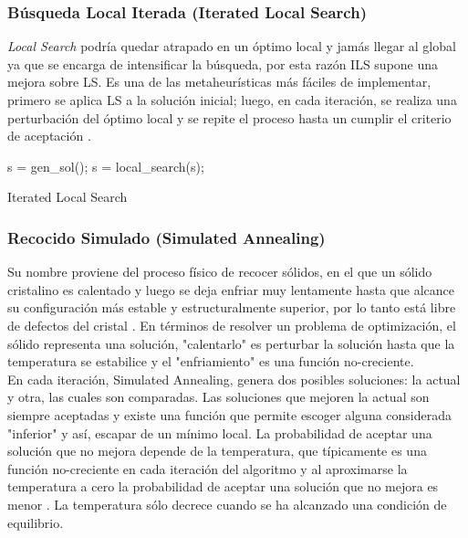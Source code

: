 \documentclass{ci5652}
\begin{document}

\subsubsection{Búsqueda Local Iterada (Iterated Local Search)}

\textit{Local Search} podría quedar atrapado en un óptimo local y jamás llegar 
al global ya que se encarga de intensificar la búsqueda, por esta razón ILS 
supone una mejora sobre LS. Es una de las metaheurísticas más fáciles de 
implementar, primero se aplica LS a la solución inicial; luego, en cada 
iteración, se realiza una perturbación del óptimo local y se repite el proceso 
hasta un cumplir el criterio de aceptación \cite{Talbi_2009}.\\

\begin{algorithm}
 \DontPrintSemicolon
 \vspace*{0.1cm}
  s = gen\_sol();\;
  s = local\_search(s);\;
 \vspace*{0.1cm}
 \caption{Iterated Local Search}
\end{algorithm}



\subsubsection{Recocido Simulado (Simulated Annealing)}

Su nombre proviene del proceso físico de recocer sólidos, en el que un sólido 
cristalino es calentado y luego se deja enfriar muy lentamente hasta que alcance
su configuración más estable y estructuralmente superior, por lo tanto está 
libre de defectos del cristal \cite{Glover_2003}. En términos de resolver un 
problema de optimización, el sólido representa una solución, "calentarlo" es 
perturbar la solución hasta que la temperatura se estabilice y el "enfriamiento"
es una función no-creciente.\\

En cada iteración, Simulated Annealing, genera dos posibles soluciones: la 
actual y otra, las cuales son comparadas. Las soluciones que mejoren la actual 
son siempre aceptadas y existe una función que permite escoger alguna 
considerada "inferior" y así, escapar de un mínimo local. La probabilidad de
aceptar una solución que no mejora depende de la temperatura, que típicamente es
una función no-creciente en cada iteración del algoritmo y al aproximarse la
temperatura a cero la probabilidad de aceptar una solución que no mejora es 
menor \cite{Glover_2003}. La temperatura sólo decrece cuando se ha alcanzado una 
condición de equilibrio.\\ 
\end{document}
